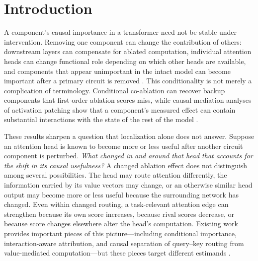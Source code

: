 \documentclass[pdflatex,sn-mathphys-ay]{sn-jnl}
\begin{document}
\section{Introduction}\label{sec:introduction}

A component's causal importance in a transformer need not be stable under intervention. Removing one component can change the contribution of others: downstream layers can compensate for ablated computation, individual attention heads can change functional role depending on which other heads are available, and components that appear unimportant in the intact model can become important after a primary circuit is removed \citep{mcgrath2023hydra,mcdougall2023copysuppression,rushing2024selfrepair,nam2025causalhead,gong2026coax}. This conditionality is not merely a complication of terminology. Conditional co-ablation can recover backup components that first-order ablation scores miss, while causal-mediation analyses of activation patching show that a component's measured effect can contain substantial interactions with the state of the rest of the model \citep{gong2026coax,vaidyanathan2026curse}.

These results sharpen a question that localization alone does not answer. Suppose an attention head is known to become more or less useful after another circuit component is perturbed. \emph{What changed in and around that head that accounts for the shift in its causal usefulness?} A changed ablation effect does not distinguish among several possibilities. The head may route attention differently, the information carried by its value vectors may change, or an otherwise similar head output may become more or less useful because the surrounding network has changed. Even within changed routing, a task-relevant attention edge can strengthen because its own score increases, because rival scores decrease, or because score changes elsewhere alter the head's computation. Existing work provides important pieces of this picture---including conditional importance, interaction-aware attribution, and causal separation of query--key routing from value-mediated computation---but these pieces target different estimands \citep{gong2026coax,vaidyanathan2026curse,wang2026fewshot}.
\end{document}
